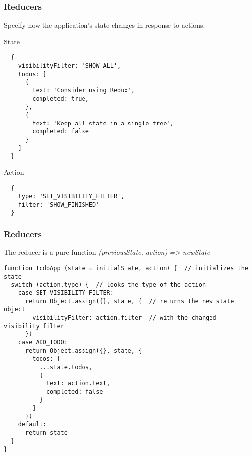 \begin{frame}[fragile]
  \frametitle{Reducers}
  Specify how the application's state changes in response to actions.

  \begin{multicols}{2}
  \footnotesize State
	\begin{verbatim}
  {
    visibilityFilter: 'SHOW_ALL',
    todos: [
      {
        text: 'Consider using Redux',
        completed: true,
      },
      {
        text: 'Keep all state in a single tree',
        completed: false
      }
    ]
  }
  \end{verbatim}

  \columnbreak

  \footnotesize Action
	\begin{verbatim}
  {
    type: 'SET_VISIBILITY_FILTER',
    filter: 'SHOW_FINISHED'
  }
  \end{verbatim}

  \end{multicols}
\end{frame}

\begin{frame}[fragile]
  \frametitle{Reducers}

\small The reducer is a pure function \textit{(previousState, action) => newState}

\begin{verbatim}
function todoApp (state = initialState, action) {  // initializes the state
  switch (action.type) {  // looks the type of the action
    case SET_VISIBILITY_FILTER:
      return Object.assign({}, state, {  // returns the new state object
        visibilityFilter: action.filter  // with the changed visibility filter
      })
    case ADD_TODO:
      return Object.assign({}, state, {
        todos: [
          ...state.todos,
          {
            text: action.text,
            completed: false
          }
        ]
      })    
    default:
      return state
  }
}
\end{verbatim}

\end{frame}



